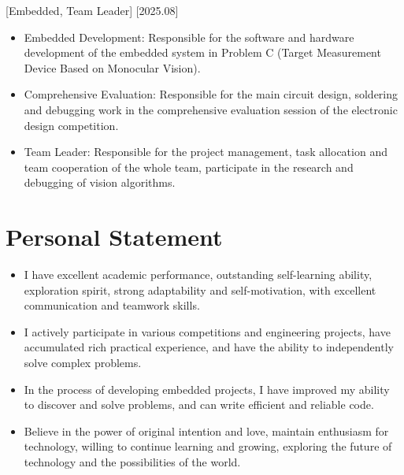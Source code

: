 \documentclass{resume}
\begin{document}
[Embedded, Team Leader]
[2025.08]
\begin{itemize}
  \item Embedded Development: Responsible for the software and hardware development of the embedded system in Problem C (Target Measurement Device Based on Monocular Vision).
  \item Comprehensive Evaluation: Responsible for the main circuit design, soldering and debugging work in the comprehensive evaluation session of the electronic design competition.
  \item Team Leader: Responsible for the project management, task allocation and team cooperation of the whole team, participate in the research and debugging of vision algorithms.
\end{itemize}

\section{Personal Statement}

\begin{itemize}
  \item I have excellent academic performance, outstanding self-learning ability, exploration spirit, strong adaptability and self-motivation, with excellent communication and teamwork skills.
  \item I actively participate in various competitions and engineering projects, have accumulated rich practical experience, and have the ability to independently solve complex problems.
  \item In the process of developing embedded projects, I have improved my ability to discover and solve problems, and can write efficient and reliable code.
  \item Believe in the power of original intention and love, maintain enthusiasm for technology, willing to continue learning and growing, exploring the future of technology and the possibilities of the world.
\end{itemize}
\end{document}
